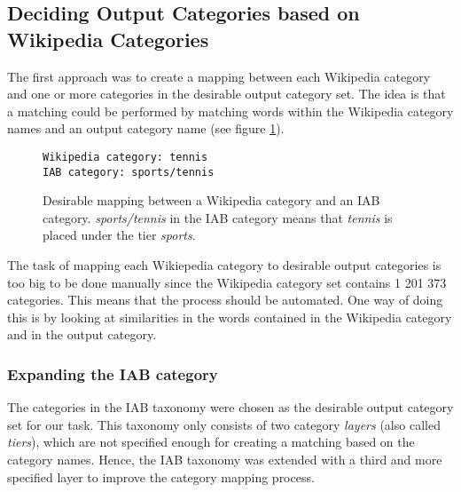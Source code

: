 \subsection{Deciding Output Categories based on Wikipedia Categories}
The first approach was to create a mapping between each Wikipedia category and one or more categories in the desirable output category set. The idea is that a matching could be performed by matching words within the Wikipedia category names and an output category name (see figure \ref{fig:category_to_category_mapping}).

\begin{figure}[h]
\centering
\begin{lstlisting}
Wikipedia category: tennis
IAB category: sports/tennis
\end{lstlisting}
\caption[Example mapping between Wikipedia category and IAB category]{Desirable mapping between a Wikipedia category and an IAB category. \emph{sports/tennis} in the IAB category means that \emph{tennis} is placed under the tier \emph{sports}.}
\label{fig:category_to_category_mapping}
\end{figure}

The task of mapping each Wikiepedia category to desirable output categories is too big to be done manually since the Wikipedia category set contains 1 201 373 categories. This means that the process should be automated. One way of doing this is by looking at similarities in the words contained in the Wikipedia category and in the output category.

\subsubsection{Expanding the IAB category}
The categories in the IAB taxonomy were chosen as the desirable output category set for our task. This taxonomy  only consists of two category \emph{layers} (also called \emph{tiers}), which are not specified enough for creating a matching based on the category names. Hence, the IAB taxonomy was extended with a third and more specified layer to improve the category mapping process. 


